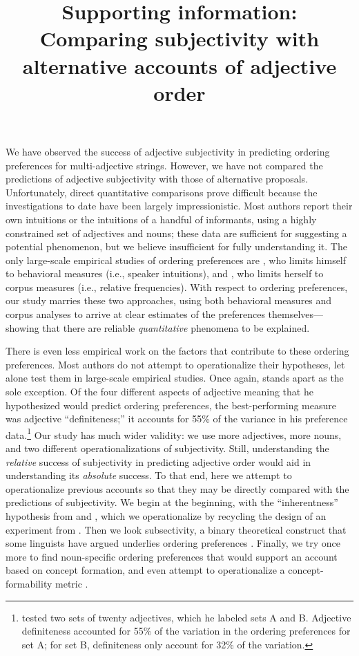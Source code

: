 \documentclass[12pt]{article}
\title{Supporting information: Comparing subjectivity with alternative accounts of adjective order}
\date{}
\begin{document}
\maketitle

We have observed the success of adjective subjectivity in predicting ordering preferences for multi-adjective strings. However, we have not compared the predictions of adjective subjectivity with those of alternative proposals. Unfortunately, direct quantitative comparisons prove difficult because the investigations to date have been largely impressionistic. Most authors report their own intuitions or the intuitions of a handful of informants, using a highly constrained set of adjectives and nouns; these data are sufficient for suggesting a potential phenomenon, but we believe insufficient for fully understanding it. The only large-scale empirical studies of ordering preferences are \citet{martin1969}, who limits himself to behavioral measures (i.e., speaker intuitions), and \citet{wulff2003}, who limits herself to corpus measures (i.e., relative frequencies). With respect to ordering preferences, our study marries these two approaches, using both behavioral measures and corpus analyses to arrive at clear estimates of the preferences themselves---showing that there are reliable \emph{quantitative} phenomena to be explained.

There is even less empirical work on the factors that contribute to these ordering preferences. Most authors do not attempt to operationalize their hypotheses, let alone test them in large-scale empirical studies. Once again, \citet{martin1969} stands apart as the sole exception. Of the four different aspects of adjective meaning that he hypothesized would predict ordering preferences, the best-performing measure was adjective ``definiteness;'' it accounts for 55\% of the variance in his preference data.\footnote{\citet{martin1969} tested two sets of twenty adjectives, which he labeled sets A and B. Adjective definiteness accounted for 55\% of the variation in the ordering preferences for set A; for set B, definiteness only account for 32\% of the variation.} Our study has much wider validity: we use more adjectives, more nouns, and two different operationalizations of subjectivity. Still, understanding the \emph{relative} success of subjectivity in predicting adjective order would aid in understanding its \emph{absolute} success. To that end, here we attempt to operationalize previous accounts so that they may be directly compared with the predictions of subjectivity. We begin at the beginning, with the ``inherentness'' hypothesis from \citet{sweet1898} and \citet{whorf1945}, which we operationalize by recycling the design of an experiment from \citet{martin1969}. Then we look subsectivity, a binary theoretical construct that some linguists have argued underlies ordering preferences \citep[e.g.,][]{truswell2009}. Finally, we try once more to find noun-specific ordering preferences that would support an account based on concept formation, and even attempt to operationalize a concept-formability metric \citep{McNally2004,bouchard2005,svenonius2008}.
\end{document}
